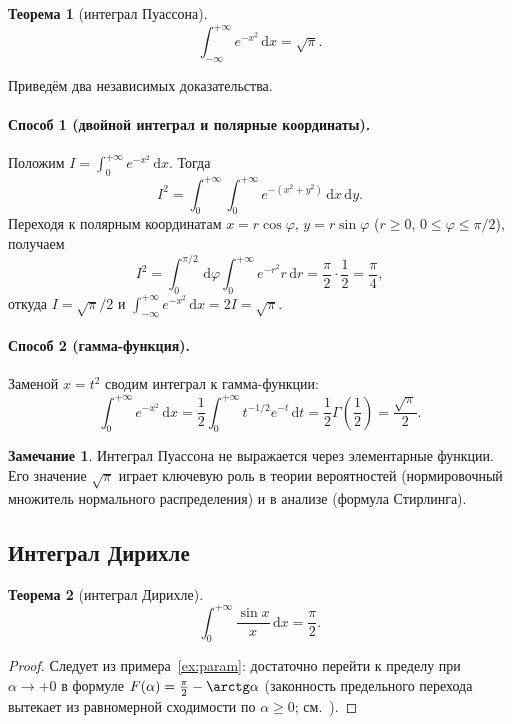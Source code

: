 \documentclass[12pt,a4paper]{article}
\newtheorem{theorem}{Теорема}[section]
\theoremstyle{definition}
\newtheorem{remark}{Замечание}[section]
\newcommand{\dd}{\,\mathrm{d}}
\begin{document}
\begin{theorem}[интеграл Пуассона]
\[
\int_{-\infty}^{+\infty}e^{-x^2}\dd x = \sqrt{\pi}.
\]
\end{theorem}

Приведём два независимых доказательства.

\paragraph{Способ 1 (двойной интеграл и полярные координаты).}
Положим $I=\int_0^{+\infty}e^{-x^2}\dd x$. Тогда
\[
I^2=\int_0^{+\infty}\!\!\int_0^{+\infty}e^{-(x^2+y^2)}\dd x\dd y.
\]
Переходя к полярным координатам $x=r\cos\varphi$, $y=r\sin\varphi$ ($r\ge0$, $0\le\varphi\le\pi/2$), получаем
\[
I^2=\int_0^{\pi/2}\dd\varphi\int_0^{+\infty}e^{-r^2}r\dd r=\frac{\pi}{2}\cdot\frac12=\frac{\pi}{4},
\]
откуда $I=\sqrt{\pi}/2$ и $\int_{-\infty}^{+\infty}e^{-x^2}\dd x=2I=\sqrt{\pi}$.

\paragraph{Способ 2 (гамма-функция).}
Заменой $x=t^2$ сводим интеграл к гамма-функции:
\[
\int_0^{+\infty}e^{-x^2}\dd x=\frac12\int_0^{+\infty}t^{-1/2}e^{-t}\dd t=\frac12\Gamma\!\left(\frac12\right)=\frac{\sqrt{\pi}}{2}.
\]

\begin{remark}
Интеграл Пуассона не выражается через элементарные функции. Его значение $\sqrt{\pi}$ играет ключевую роль в теории вероятностей (нормировочный множитель нормального распределения) и в анализе (формула Стирлинга).
\end{remark}

\subsection{Интеграл Дирихле}

\begin{theorem}[интеграл Дирихле]
\[
\int_0^{+\infty}\frac{\sin x}{x}\dd x=\frac{\pi}{2}.
\]
\end{theorem}

\begin{proof}
Следует из примера~\ref{ex:param}: достаточно перейти к пределу при $\alpha\to+0$ в формуле $F(\alpha)=\frac{\pi}{2}-\arctg\alpha$ (законность предельного перехода вытекает из равномерной сходимости по $\alpha\ge 0$; см.~\cite[гл.~XVII,~\S2]{Zorich2}).
\end{proof}
\end{document}
